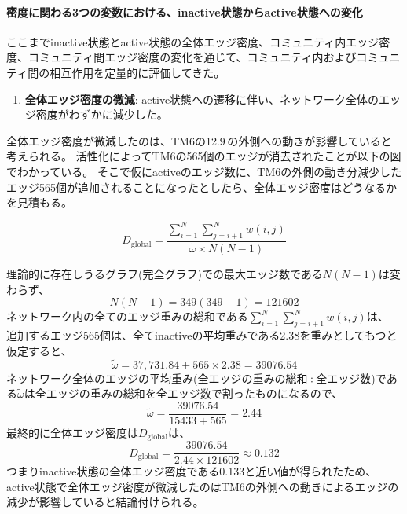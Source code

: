 \paragraph{密度に関わる3つの変数における、inactive状態からactive状態への変化}

ここまでinactive状態とactive状態の全体エッジ密度、コミュニティ内エッジ密度、コミュニティ間エッジ密度の変化を通じて、コミュニティ内およびコミュニティ間の相互作用を定量的に評価してきた。
\begin{enumerate}
  \item \textbf{全体エッジ密度の微減}: active状態への遷移に伴い、ネットワーク全体のエッジ密度がわずかに減少した。
\end{enumerate}

全体エッジ密度が微減したのは、TM6の12.9\,\text{\AA}の外側への動きが影響していると考えられる。
活性化によってTM6の565個のエッジが消去されたことが以下の図でわかっている。
そこで仮にactiveのエッジ数に、TM6の外側の動き分減少したエッジ565個が追加されることになったとしたら、全体エッジ密度はどうなるかを見積もる。

\begin{equation}
  D_{\text{global}} = \frac{\sum_{i=1}^{N} \sum_{j=i+1}^{N} w(i, j)}{\tilde{\omega} \times N(N-1)}
\end{equation}

理論的に存在しうるグラフ(完全グラフ)での最大エッジ数である$N(N-1)$は変わらず、
\begin{equation}
  N(N-1) = 349(349-1) = 121602
\end{equation}
ネットワーク内の全てのエッジ重みの総和である$\sum_{i=1}^{N} \sum_{j=i+1}^{N} w(i, j)$は、
追加するエッジ565個は、全てinactiveの平均重みである2.38を重みとしてもつと仮定すると、
\begin{equation}
  \tilde{\omega} = 37,731.84+565 \times 2.38 = 39076.54
\end{equation}
ネットワーク全体のエッジの平均重み(全エッジの重みの総和÷全エッジ数)である$\tilde{\omega}$は全エッジの重みの総和を全エッジ数で割ったものになるので、
\begin{equation}
  \tilde{\omega} = \frac{39076.54}{15433+565} = 2.44
\end{equation}
最終的に全体エッジ密度は$D_{\text{global}}$は、
\begin{equation}
  D_{\text{global}} = \frac{39076.54}{2.44 \times 121602} \approx 0.132
\end{equation}
つまりinactive状態の全体エッジ密度である0.133と近い値が得られたため、
active状態で全体エッジ密度が微減したのはTM6の外側への動きによるエッジの減少が影響していると結論付けられる。


